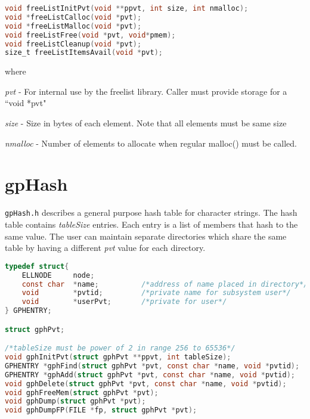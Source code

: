 \begin{lstlisting}[language=C]
void freeListInitPvt(void **ppvt, int size, int nmalloc);
void *freeListCalloc(void *pvt);
void *freeListMalloc(void *pvt);
void freeListFree(void *pvt, void*pmem);
void freeListCleanup(void *pvt);
size_t freeListItemsAvail(void *pvt);
\end{lstlisting}

where

\begin{description}
\item \emph{pvt}  - For internal use by the freelist library. Caller must provide storage for a ``void *pvt"

\item \emph{size} - Size in bytes of each element. Note that all elements must be same size

\item \emph{nmalloc} - Number of elements to allocate when regular malloc() must be called.

\end{description}

\section{gpHash}

\verb|gpHash.h| describes a general purpose hash table for character strings. The hash table contains \emph{tableSize} entries. Each 
entry is a list of members that hash to the same value. The user can maintain separate directories which share the same 
table by having a different \emph{pvt} value for each directory.

\begin{lstlisting}[language=C]
typedef struct{
    ELLNODE     node;
    const char  *name;          /*address of name placed in directory*/
    void        *pvtid;         /*private name for subsystem user*/
    void        *userPvt;       /*private for user*/
} GPHENTRY;

struct gphPvt;

/*tableSize must be power of 2 in range 256 to 65536*/
void gphInitPvt(struct gphPvt **ppvt, int tableSize);
GPHENTRY *gphFind(struct gphPvt *pvt, const char *name, void *pvtid);
GPHENTRY *gphAdd(struct gphPvt *pvt, const char *name, void *pvtid);
void gphDelete(struct gphPvt *pvt, const char *name, void *pvtid);
void gphFreeMem(struct gphPvt *pvt);
void gphDump(struct gphPvt *pvt);
void gphDumpFP(FILE *fp, struct gphPvt *pvt);
\end{lstlisting}

